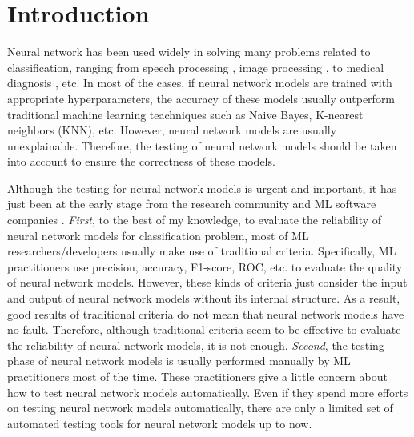 \documentclass[12pt]{article}
\begin{document}





\newpage
\tableofcontents

\newpage

\listoffigures

\listoftables

\newpage
\section{Introduction}

Neural network has been used widely in solving many problems related to classification, ranging from speech processing \cite{speech-processing}, image processing \cite{image-processing}, to medical diagnosis \cite{medical-diagnosis}, etc. In most of the cases, if neural network models are trained with appropriate hyperparameters, the accuracy of these models usually outperform traditional machine learning teachniques such as Naive Bayes, K-nearest neighbors (KNN), etc. However, neural network models are usually unexplainable. Therefore, the testing of neural network models should be taken into account to ensure the correctness of these models.

Although the testing for neural network models is urgent and important, it has just been at the early stage from the research community and ML software companies \cite{DeepXplore}.  \textit{First}, to the best of my knowledge, to evaluate the reliability of neural network models for classification problem, most of ML researchers/developers usually make use of traditional criteria. Specifically, ML practitioners use precision, accuracy, F1-score, ROC, etc. to evaluate the quality of neural network models. However, these kinds of criteria just consider the input and output of neural network models without its internal structure. As a result, good results of traditional criteria do not mean that neural network models have no fault. Therefore, although traditional criteria seem to be effective to evaluate the reliability of neural network models, it is not enough. 
\textit{Second}, the testing phase of neural network models is usually performed manually by ML practitioners most of the time. These practitioners give a little concern about how to test neural network models automatically. Even if they spend more efforts on testing neural network models automatically, there are only a limited set of automated testing tools for neural network models up to now. 
\end{document}
